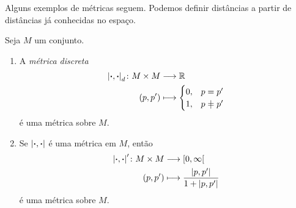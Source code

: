 Alguns exemplos de métricas seguem. Podemos definir distâncias a partir de distâncias já conhecidas no espaço.

\begin{exercise}
Seja $M$ um conjunto.
	\begin{enumerate}
	\item A \emph{métrica discreta}
		\begin{align*}
		\func{\dist{\var}{\var}_d}{M \times M}{\R}{(p,p')}{
			\begin{cases}
				0,& p = p' \\
				1,& p \neq p'
			\end{cases}
		}
		\end{align*}
é uma métrica sobre $M$.

	\item Se $\left\vert{\bm{\cdot}},{\bm{\cdot}}\right\vert$ é uma métrica em $M$, então
		\begin{align*}
		{\left\vert{\bm{\cdot}},{\bm{\cdot}}\right\vert'}\colon {M \times M} &\longrightarrow {\left[{0},{\infty}\right[} \\{(p,p')} &\longmapsto \frac{\left\vert{p},{p'}\right\vert}{1+\left\vert{p},{p'}\right\vert}
		\end{align*}
	é uma métrica sobre $M$.
	\end{enumerate}
\end{exercise}


